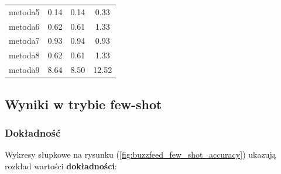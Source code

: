 \begin{table}[H]
\begin{tabular}{lccc}
		metoda5           & 0.14          & 0.14             & 0.33           \\
		metoda6           & 0.62          & 0.61             & 1.33           \\
		metoda7           & 0.93          & 0.94             & 0.93           \\
		metoda8           & 0.62          & 0.61             & 1.33           \\
		metoda9           & 8.64          & 8.50             & 12.52          \\
		\bottomrule
	\end{tabular}
\end{table}

\subsection{Wyniki w trybie few-shot}
\subsubsection{Dokładność}
Wykresy słupkowe na rysunku (\ref{fig:buzzfeed_few_shot_accuracy}) ukazują rozkład wartości \textbf{dokładności}:

